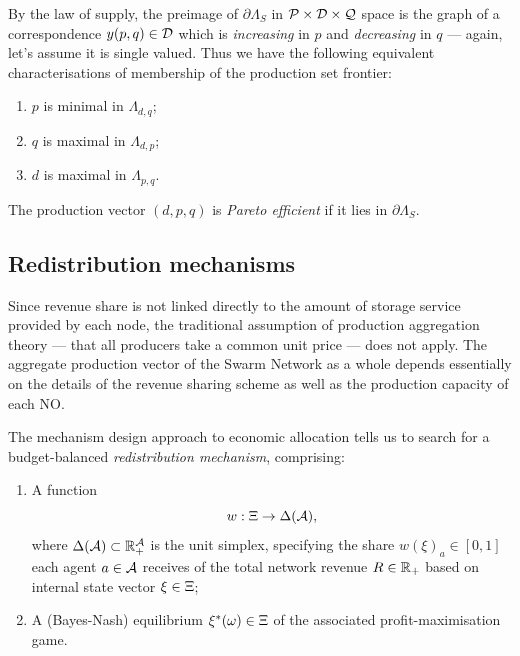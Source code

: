 By the law of supply, the preimage of $\partial\Lambda_S$ in $\mathcal{P}\times\mathcal{D}\times\mathcal{Q}$ space is the graph of a correspondence $y(p,q)\in\mathcal{D}$ which is \emph{increasing} in $p$ and \emph{decreasing} in $q$ --- again, let's assume it is single valued.
%
Thus we have the following equivalent characterisations of membership of the production set frontier:
%
\begin{enumerate}
  \item $p$ is minimal in $\Lambda_{d,q}$;
  \item $q$ is maximal in $\Lambda_{d,p}$;
  \item $d$ is maximal in $\Lambda_{p,q}$.
\end{enumerate}

\begin{definition}
  \label{def:efficient}

  The production vector $(d,p,q)$ is \emph{Pareto efficient} if it lies in $\partial\Lambda_S$.

\end{definition}



\subsection{Redistribution mechanisms}
\label{section:redistribution}

Since revenue share is not linked directly to the amount of storage service provided by each node, the traditional assumption of production aggregation theory \cite[\S5.E]{mascollel1995microeconomic} --- that all producers take a common unit price --- does not apply.
%
The aggregate production vector of the Swarm Network as a whole depends essentially on the details of the revenue sharing scheme as well as the production capacity of each NO.

The mechanism design approach to economic allocation tells us to search for a budget-balanced \emph{redistribution mechanism}, comprising:
\begin{enumerate}
  \item
    A function
    \[
      w:\Xi\rightarrow \Delta(\mathcal{A}),
    \]
    where $\Delta(\mathcal{A})\subset\mathbb{R}_+^{\mathcal{A}}$ is the unit simplex, specifying the share $w(\xi)_a\in [0,1]$ each agent $a\in\mathcal{A}$ receives of the total network revenue $R\in\mathbb{R}_+$ based on internal state vector $\xi\in\Xi$;
    
  \item
    A (Bayes-Nash) equilibrium $\xi^*(\omega)\in\Xi$ of the associated profit-maximisation game.
\end{enumerate}

